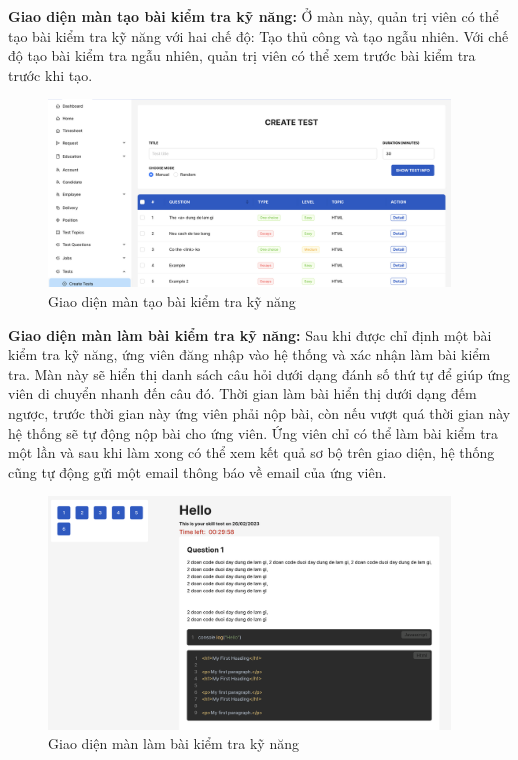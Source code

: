 \documentclass[../DoAn.tex]{subfiles}
\begin{document}
\textbf{Giao diện màn tạo bài kiểm tra kỹ năng:}
Ở màn này, quản trị viên có thể tạo bài kiểm tra kỹ năng với hai chế độ: Tạo thủ công và tạo ngẫu nhiên. Với chế độ tạo bài kiểm tra ngẫu nhiên, quản trị viên có thể xem trước bài kiểm tra trước khi tạo. 
\begin{figure}[H]
    \centering
    \includegraphics[width=0.95\textwidth]{Hinhve/TaoBaiKiemTra.png}
    \caption{Giao diện màn tạo bài kiểm tra kỹ năng}
\end{figure}


\textbf{Giao diện màn làm bài kiểm tra kỹ năng:}
Sau khi được chỉ định một bài kiểm tra kỹ năng, ứng viên đăng nhập vào hệ thống và xác nhận làm bài kiểm tra. Màn này sẽ hiển thị danh sách câu hỏi dưới dạng đánh số thứ tự để giúp ứng viên di chuyển nhanh đến câu đó. Thời gian làm bài hiển thị dưới dạng đếm ngược, trước thời gian này ứng viên phải nộp bài, còn nếu vượt quá thời gian này hệ thống sẽ tự động nộp bài cho ứng viên. Ứng viên chỉ có thể làm bài kiểm tra một lần và sau khi làm xong có thể xem kết quả sơ bộ trên giao diện, hệ thống cũng tự động gửi một email thông báo về email của ứng viên.
\begin{figure}[H]
    \centering
    \includegraphics[width=0.95\textwidth]{Hinhve/LamBaiKiemTra.png}
    \caption{Giao diện màn làm bài kiểm tra kỹ năng}
\end{figure}
\end{document}
